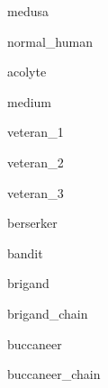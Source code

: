 \documentclass[letterpaper,serif]{module}
\begin{document}
\begin{newmonster}{medusa}\end{newmonster}


\begin{newmonster}{normal_human}\end{newmonster}

\begin{newmonster}{acolyte}\end{newmonster}

\begin{newmonster}{medium}\end{newmonster}

\begin{newmonster}{veteran_1}\end{newmonster}

\begin{newmonster}{veteran_2}\end{newmonster}

\begin{newmonster}{veteran_3}\end{newmonster}

\begin{newmonster}{berserker}\end{newmonster}

\begin{newmonster}{bandit}\end{newmonster}

\begin{newmonster}{brigand}\end{newmonster}

\begin{newmonster}{brigand_chain}\end{newmonster}

\begin{newmonster}{buccaneer}\end{newmonster}

\begin{newmonster}{buccaneer_chain}\end{newmonster}
\end{document}
